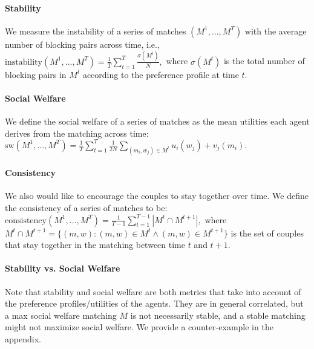 \paragraph{Stability} We measure the instability of a series of matches $(M^1, \ldots, M^T)$ with the average number of blocking pairs across time, i.e.,
$
    \mbox{instability}(M^1, \ldots, M^T) = \frac{1}{T}\sum_{t=1}^T{\frac{\sigma(M^t)}{N}},
$
where $\sigma(M^t)$ is the total number of blocking pairs in $M^t$ according to the preference profile at time $t$.
\paragraph{Social Welfare} We define the social welfare of a series of matches as the mean utilities each agent derives from the matching across time:
$
    \mbox{sw}(M^1, \ldots, M^T) = \frac{1}{T}\sum_{t=1}^T{\frac{1}{2N}{\sum_{(m_i, w_j)\in M^t}{u_i(w_j) + v_j(m_i)}}}.
$
\paragraph{Consistency} We also would like to encourage the couples to stay together over time. We define the consistency of a series of matches to be:
$
    \mbox{consistency}(M^1, \ldots, M^T) = \frac{1}{T-1}\sum_{t=1}^{T-1}{|M^t \cap M^{t+1}|},
$
where $M^t \cap M^{t+1} = \{(m, w): (m, w) \in M^t \wedge (m, w) \in M^{t+1}\}$ is the set of couples that stay together in the matching between time $t$ and $t+1$.

\paragraph{Stability vs. Social Welfare} Note that stability and social welfare are both metrics that take into account of the preference profiles/utilities of the agents. They are in general correlated, but a max social welfare matching $M$ is not necessarily stable, and a stable matching might not maximize social welfare. We provide a counter-example in the appendix.


